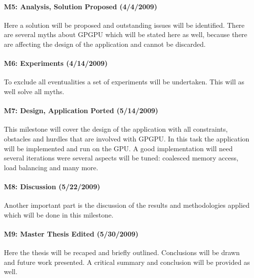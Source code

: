 \paragraph{M5: Analysis, Solution Proposed (4/4/2009)} %
\label{par:m5_analysis_solution_proposed}
Here a solution will be proposed and outstanding issues will be identified. 
There are several myths about GPGPU which will be stated here as well, because 
there are affecting the design of the application and cannot be discarded.
\paragraph{M6: Experiments (4/14/2009)} %
\label{par:m6_experiments}
To exclude all eventualities a set of experiments will be undertaken. This will 
as well solve all myths.
\paragraph{M7: Design, Application Ported (5/14/2009)} %
\label{par:m7_design_application_ported}
This milestone will cover the design of the application with all constraints,
obstacles and hurdles that are involved with GPGPU. In this task the application
will be implemented and run on the GPU. A good implementation will need several
iterations were several aspects will be tuned: coalesced memory access, load
balancing and many more.
\paragraph{M8: Discussion (5/22/2009)} %
\label{par:m8_discussion}
Another important part is the discussion of the results and methodologies
applied which will be done in this milestone.

\paragraph{M9: Master Thesis Edited (5/30/2009)} %
\label{par:master_thesis_edited}
Here the thesis will be recaped and briefly outlined. Conclusions will be drawn
and future work presented. A critical summary and conclusion will be provided as
well. %

